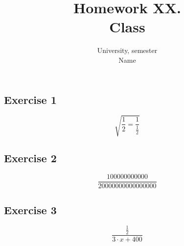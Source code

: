 \documentclass[leqno, 11pt]{article}
\title{\textbf{Homework XX.} \\ \small Class}
\author{University, semester
\\Name}
\begin{document}
\maketitle
\subsection*{Exercise 1}
\begin{equation}
  \sqrt{\frac{1}{2} = \frac{1}{\frac{1}{2}}}
\end{equation}
\subsection*{Exercise 2}
\begin{equation}
  \frac{100000000000}{20000000000000000}
\end{equation}
\subsection*{Exercise 3}
  \begin{equation}
    \frac{ \frac{1}{2} }
    {3 \cdot x + 400}
  \end{equation}
\end{document}
